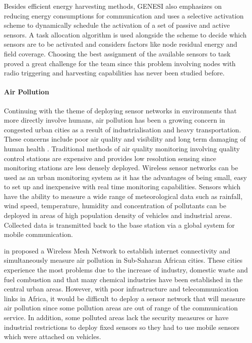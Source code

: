 Besides efficient energy harvesting methods, GENESI also emphasizes on reducing energy consumptions for communication and uses a selective activation scheme to dynamically schedule the activation of a set of passive and active sensors. A task allocation algorithm is used alongside the scheme to decide which sensors are to be activated and considers factors like node residual energy and field coverage. Choosing the best assignment of the available sensors to task proved a great challenge for the team since this problem involving nodes with radio triggering and harvesting capabilities has never been studied before.


\paragraph{Air Pollution} Continuing with the theme of deploying sensor networks in environments that more directly involve humans, air pollution has been a growing concern in congested urban cities as a result of industrialisation and heavy transportation. These concerns include poor air quality and visibility and long term damaging of human health \cite{libeliumAirPollution,wsnpollution}. Traditional methods of air quality monitoring involving quality control stations are expensive and provides low resolution sensing since monitoring stations are less densely deployed. Wireless sensor networks can be used as an urban monitoring system as it has the advantages of being small, easy to set up and inexpensive with real time monitoring capabilities. Sensors which have the ability to measure a wide range of meteorological data such as rainfall, wind speed, temperature, humidity and concentration of pollutants can be deployed in areas of high population density of vehicles and industrial areas. Collected data is transmitted back to the base station via a global system for mobile communication.

\citeauthor{fotuewsnpollution} in \cite{fotuewsnpollution} proposed a Wireless Mesh Network to establish internet connectivity and simultaneously measure air pollution in Sub-Saharan African cities. These cities experience the most problems due to the increase of industry, domestic waste and fuel combustion and that many chemical industries have been established in the central urban areas. However, with poor infrastructure and telecommunication links in Africa, it would be difficult to deploy a sensor network that will measure air pollution since some pollution areas are out of range of the communication service. In addition, some polluted areas lack the security measures or have industrial restrictions to deploy fixed sensors so they had to use mobile sensors which were attached on vehicles. 

